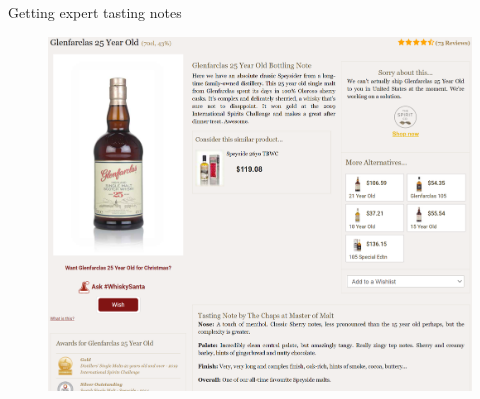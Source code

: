 \documentclass{beamer}
\begin{document}
	\begin{frame}{Getting expert tasting notes}
	
	

			\begin{figure}
				
				\includegraphics[scale = 0.4]{product_page}
				
			\end{figure}

\end{frame}
\end{document}
